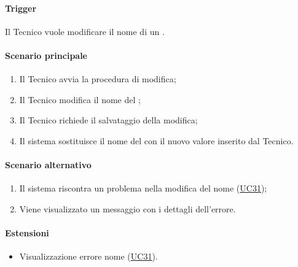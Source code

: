 \paragraph*{Trigger}
Il Tecnico vuole modificare il nome di un .

\paragraph*{Scenario principale}
\begin{enumerate}
  \item Il Tecnico avvia la procedura di modifica;
  \item Il Tecnico modifica il nome del ;
  \item Il Tecnico richiede il salvataggio della modifica;
  \item Il sistema sostituisce il nome del  con il nuovo valore inserito dal Tecnico.
\end{enumerate}

\paragraph*{Scenario alternativo}
\begin{enumerate}
  \item Il sistema riscontra un problema nella modifica del nome (\hyperref[UC31]{UC31});
  \item Viene visualizzato un messaggio con i dettagli dell'errore.
\end{enumerate}

\paragraph*{Estensioni}
\begin{itemize}
  \item Visualizzazione errore nome  (\hyperref[UC31]{UC31}).
\end{itemize}